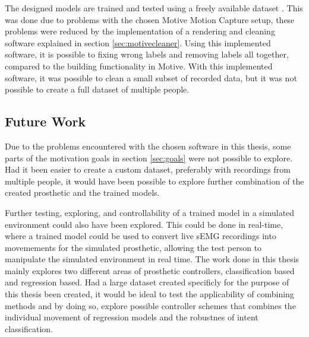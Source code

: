 \documentclass[../main.tex]{subfiles}
\begin{document}
The designed models are trained and tested using a freely available dataset \cite{kinmus}.
This was done due to problems with the chosen Motive Motion Capture setup, these problems were reduced by the implementation of a rendering and cleaning software explained in section \ref{sec:motivecleaner}.
Using this implemented software, it is possible to fixing wrong labels and removing labels all together, compared to the building functionality in Motive.
With this implemented software, it was possible to clean a small subset of recorded data, but it was not possible to create a full dataset of multiple people.



\newpage
\subsection{Future Work}

Due to the problems encountered with the chosen software in this thesis, some parts of the motivation goals in section \ref{sec:goals} were not possible to explore.
Had it been easier to create a custom dataset, preferably with recordings from multiple people, it would have been possible to explore further combination of the created prosthetic and the trained models.

Further testing, exploring, and controllability of a trained model in a simulated environment could also have been explored.
This could be done in real-time, where a trained model could be used to convert live sEMG recordings into movemements for the simulated prosthetic, allowing the test person to manipulate the simulated environment in real time.
The work done in this thesis mainly explores two different areas of prosthetic controllers, classification based and regression based.
Had a large dataset created specificly for the purpose of this thesis been created, it would be ideal to test the applicability of combining methods and by doing so, explore possible controller schemes that combines the individual movement of regression models and the robustnes of intent classification.  

\end{document}
